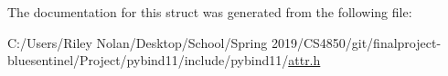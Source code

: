 The documentation for this struct was generated from the following file\+:\begin{DoxyCompactItemize}
\item 
C\+:/\+Users/\+Riley Nolan/\+Desktop/\+School/\+Spring 2019/\+C\+S4850/git/finalproject-\/bluesentinel/\+Project/pybind11/include/pybind11/\mbox{\hyperlink{attr_8h}{attr.\+h}}\end{DoxyCompactItemize}
